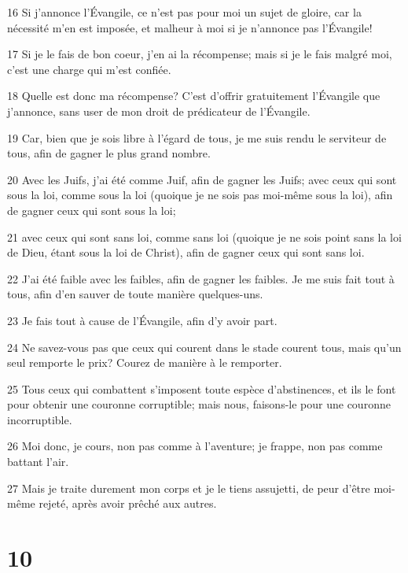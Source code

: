 \par 16 Si j'annonce l'Évangile, ce n'est pas pour moi un sujet de gloire, car la nécessité m'en est imposée, et malheur à moi si je n'annonce pas l'Évangile!
\par 17 Si je le fais de bon coeur, j'en ai la récompense; mais si je le fais malgré moi, c'est une charge qui m'est confiée.
\par 18 Quelle est donc ma récompense? C'est d'offrir gratuitement l'Évangile que j'annonce, sans user de mon droit de prédicateur de l'Évangile.
\par 19 Car, bien que je sois libre à l'égard de tous, je me suis rendu le serviteur de tous, afin de gagner le plus grand nombre.
\par 20 Avec les Juifs, j'ai été comme Juif, afin de gagner les Juifs; avec ceux qui sont sous la loi, comme sous la loi (quoique je ne sois pas moi-même sous la loi), afin de gagner ceux qui sont sous la loi;
\par 21 avec ceux qui sont sans loi, comme sans loi (quoique je ne sois point sans la loi de Dieu, étant sous la loi de Christ), afin de gagner ceux qui sont sans loi.
\par 22 J'ai été faible avec les faibles, afin de gagner les faibles. Je me suis fait tout à tous, afin d'en sauver de toute manière quelques-uns.
\par 23 Je fais tout à cause de l'Évangile, afin d'y avoir part.
\par 24 Ne savez-vous pas que ceux qui courent dans le stade courent tous, mais qu'un seul remporte le prix? Courez de manière à le remporter.
\par 25 Tous ceux qui combattent s'imposent toute espèce d'abstinences, et ils le font pour obtenir une couronne corruptible; mais nous, faisons-le pour une couronne incorruptible.
\par 26 Moi donc, je cours, non pas comme à l'aventure; je frappe, non pas comme battant l'air.
\par 27 Mais je traite durement mon corps et je le tiens assujetti, de peur d'être moi-même rejeté, après avoir prêché aux autres.

\chapter{10}

